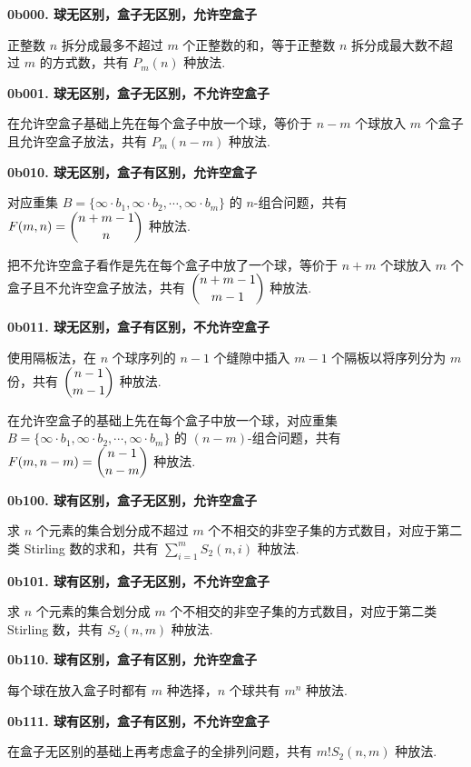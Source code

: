 \documentclass[cn, hazy, blue, normal, 12pt]{elegantnote}
\begin{document}
\begin{solution}[print=true]

    \textbf{0b000. 球无区别，盒子无区别，允许空盒子}

    正整数 $n$ 拆分成最多不超过 $m$ 个正整数的和，等于正整数 $n$ 拆分成最大数不超过 $m$ 的方式数，共有 $P_m(n)$ 种放法.

    \textbf{0b001. 球无区别，盒子无区别，不允许空盒子}

    在允许空盒子基础上先在每个盒子中放一个球，等价于 $n-m$ 个球放入 $m$ 个盒子且允许空盒子放法，共有 $P_m(n-m)$ 种放法.

    \textbf{0b010. 球无区别，盒子有区别，允许空盒子}

    对应重集 $B=\{\infty \cdot b_1,\infty \cdot b_2,\cdots,\infty \cdot b_m\}$ 的 $n\text{-}$组合问题，共有 $F(m,n)=\dbinom{n+m-1}{n}$ 种放法.

    把不允许空盒子看作是先在每个盒子中放了一个球，等价于 $n+m$ 个球放入 $m$ 个盒子且不允许空盒子放法，共有 $\dbinom{n+m-1}{m-1}$ 种放法.

    \textbf{0b011. 球无区别，盒子有区别，不允许空盒子}

    使用隔板法，在 $n$ 个球序列的 $n-1$ 个缝隙中插入 $m-1$ 个隔板以将序列分为 $m$ 份，共有 $\dbinom{n-1}{m-1}$ 种放法.

    在允许空盒子的基础上先在每个盒子中放一个球，对应重集 $B=\{\infty \cdot b_1,\infty \cdot b_2,\cdots,\infty \cdot b_m\}$ 的 $(n-m)\text{-}$组合问题，共有 $F(m,n-m)=\dbinom{n-1}{n-m}$ 种放法.

    \textbf{0b100. 球有区别，盒子无区别，允许空盒子}

    求 $n$ 个元素的集合划分成不超过 $m$ 个不相交的非空子集的方式数目，对应于第二类 Stirling 数的求和，共有 $\sum\limits_{i=1}^{m} S_2(n,i)$ 种放法.

    \textbf{0b101. 球有区别，盒子无区别，不允许空盒子}

    求 $n$ 个元素的集合划分成 $m$ 个不相交的非空子集的方式数目，对应于第二类 Stirling 数，共有 $S_2(n,m)$ 种放法.

    \textbf{0b110. 球有区别，盒子有区别，允许空盒子}

    每个球在放入盒子时都有 $m$ 种选择，$n$ 个球共有 $m^n$ 种放法.

    \textbf{0b111. 球有区别，盒子有区别，不允许空盒子}

    在盒子无区别的基础上再考虑盒子的全排列问题，共有 $m! S_2(n,m)$ 种放法.

\end{solution}
\end{document}

